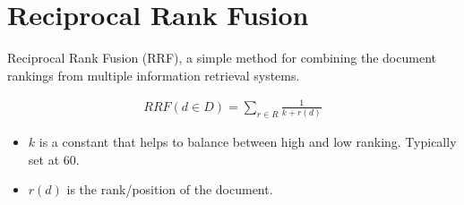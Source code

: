\section{Reciprocal Rank Fusion }
\label{sec:nlp_rrf}
Reciprocal Rank Fusion (RRF), a simple method for combining the document rankings from multiple information retrieval systems.

\begin{align*}
	RRF(d\in D) = \sum_{r\in R}\frac{1}{k+r(d)}
\end{align*}
\begin{itemize}
	\item $k$ is a constant that helps to balance between high and low ranking. Typically set at 60.
	\item $r(d)$ is the rank/position of the document.
\end{itemize}










